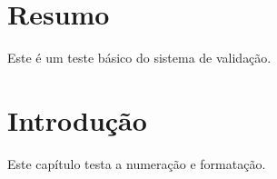 \documentclass[mestrado]{UnB-PPGT}
\begin{document}
\statusppgt

\pretextual

\chapter*{Resumo}
Este é um teste básico do sistema de validação.

\textual

\chapter{Introdução}
Este capítulo testa a numeração e formatação.
\end{document}
